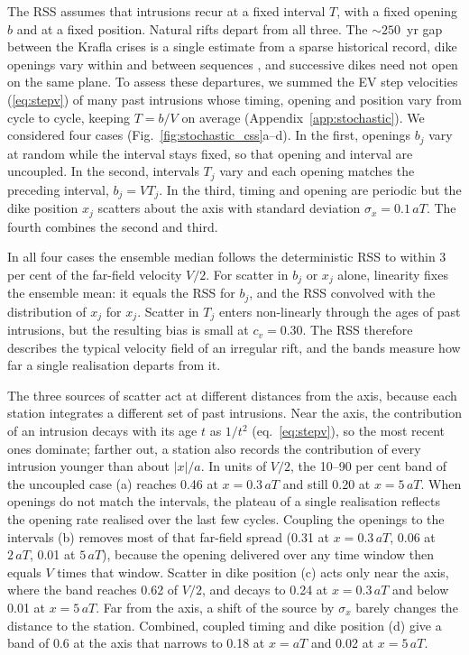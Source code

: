 \documentclass[extra]{gji}
\begin{document}
The RSS assumes that intrusions recur at a fixed interval $T$, with a
fixed opening $b$ and at a fixed position.  Natural rifts depart from all
three.  The $\sim250$~yr gap between the Krafla crises is a single
estimate from a sparse historical record, dike openings vary within and
between sequences \citep{thordarson2007volcanism}, and successive dikes
need not open on the same plane.  To assess these departures, we summed the EV step
velocities (\ref{eq:stepv}) of many past intrusions whose timing, opening
and position vary from cycle to cycle, keeping $T = b/V$ on average
(Appendix~\ref{app:stochastic}).  We considered four cases
(Fig.~\ref{fig:stochastic_css}a--d).  In the first, openings $b_j$ vary
at random while the interval stays fixed, so that opening and interval
are uncoupled.  In the second, intervals $T_j$ vary and each opening
matches the preceding interval, $b_j = V T_j$.  In the third, timing and
opening are periodic but the dike position $x_j$ scatters about the axis
with standard deviation $\sigma_x = 0.1\,aT$.  The fourth combines the
second and third.

In all four cases the ensemble median follows the deterministic RSS to
within 3 per cent of the far-field velocity $V/2$.  For scatter in $b_j$ or
$x_j$ alone, linearity fixes the ensemble mean: it equals the RSS for
$b_j$, and the RSS convolved with the distribution of $x_j$ for $x_j$.
Scatter in $T_j$ enters non-linearly through the ages of past intrusions,
but the resulting bias is small at $c_v = 0.30$.  The RSS therefore
describes the typical velocity field of an irregular rift, and the bands
measure how far a single realisation departs from it.

The three sources of scatter act at different distances from the axis,
because each station integrates a different set of past intrusions.  Near
the axis, the contribution of an intrusion decays with its age $t$ as
$1/t^2$ (eq.~\ref{eq:stepv}), so the most recent ones dominate;
farther out, a station also records the contribution of every intrusion
younger than about $|x|/a$.  In units of $V/2$, the 10--90 per cent band
of the uncoupled case (a) reaches 0.46 at $x = 0.3\,aT$ and still 0.20 at $x = 5\,aT$. When openings
do not match the intervals, the plateau of a single realisation reflects
the opening rate realised over the last few cycles.  Coupling the openings
to the intervals (b) removes most of that far-field spread (0.31 at
$x = 0.3\,aT$, 0.06 at $2\,aT$, 0.01 at $5\,aT$), because the opening
delivered over any time window then equals $V$ times that window.  Scatter
in dike position (c) acts only near the axis, where the band reaches 0.62
of $V/2$, and decays to 0.24 at $x = 0.3\,aT$ and below 0.01 at
$x = 5\,aT$.
Far from the axis, a shift of the source by $\sigma_x$ barely changes the
distance to the station.  Combined, coupled timing and dike position (d)
give a band of 0.6 at the axis that narrows to 0.18 at $x = aT$ and
0.02 at $x = 5\,aT$.
\end{document}

